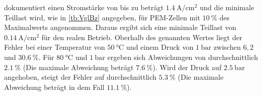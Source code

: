 \citet{chugh_experimental_2020} dokumentiert einen Stromstärke von bis zu beträgt $\SI{1,4}{\A\per\cm\squared}$ und die minimale Teillast wird, wie in \ref{tb:VglBz} angegeben, für PEM-Zellen mit $\SI{10}{\%}$ des Maximalwerts angenommen. Daraus ergibt sich eine minimale Teillast von $\SI{0,14}{\A\per\cm\squared}$ für den realen Betrieb. Oberhalb des genannten Wertes liegt der Fehler bei einer Temperatur von $\SI{50}{\degreeCelsius}$ und einem Druck von $\SI{1}{\bar}$ zwischen $6,2$ und $\SI{30,6}{\%}$. Für $\SI{80}{\degreeCelsius}$ und $\SI{1}{\bar}$ ergeben sich Abweichungen von durchschnittlich $\SI{2,1}{\%}$ (Die maximale Abweichung beträgt $\SI{7,6}{\%}$). Wird der Druck auf $\SI{2,5}{\bar}$ angehoben, steigt der Fehler auf durchschnittlich $\SI{5,3}{\%}$ (Die maximale Abweichung beträgt in dem Fall $\SI{11,1}{\%}$).\\

